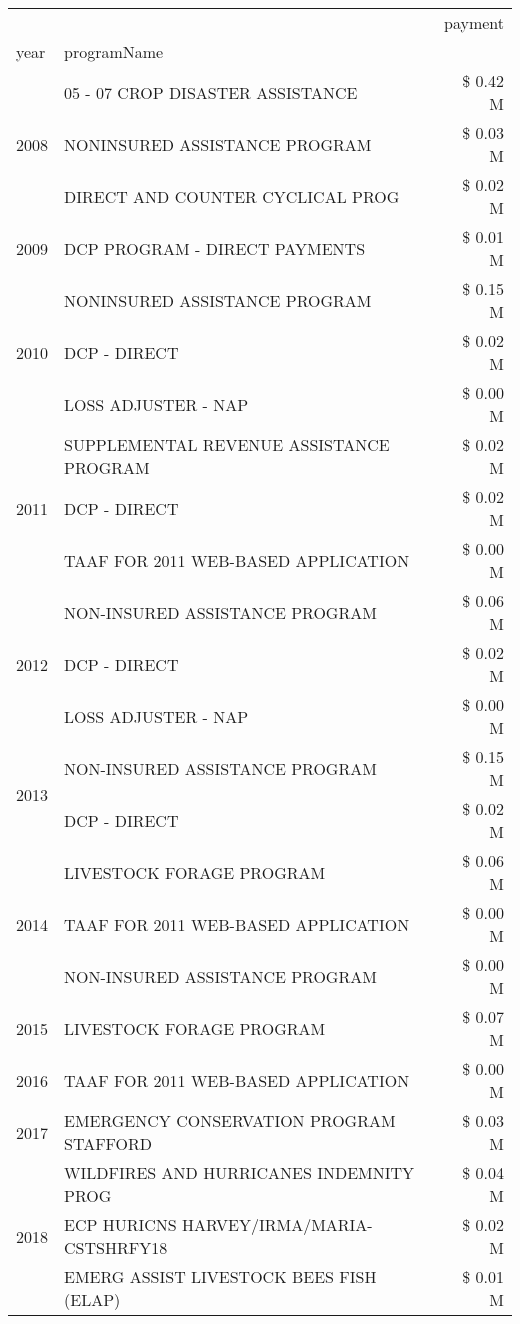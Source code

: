 \begin{tabular}{llr}
\toprule
 &  & payment \\
year & programName &  \\
\midrule
\multirow[t]{3}{*}{2008} & 05 - 07 CROP DISASTER ASSISTANCE & \$ 0.42 M \\
 & NONINSURED ASSISTANCE PROGRAM & \$ 0.03 M \\
 & DIRECT AND COUNTER CYCLICAL PROG & \$ 0.02 M \\
\cline{1-3}
2009 & DCP PROGRAM - DIRECT PAYMENTS & \$ 0.01 M \\
\cline{1-3}
\multirow[t]{3}{*}{2010} & NONINSURED ASSISTANCE PROGRAM & \$ 0.15 M \\
 & DCP - DIRECT & \$ 0.02 M \\
 & LOSS ADJUSTER - NAP & \$ 0.00 M \\
\cline{1-3}
\multirow[t]{3}{*}{2011} & SUPPLEMENTAL REVENUE ASSISTANCE PROGRAM & \$ 0.02 M \\
 & DCP - DIRECT & \$ 0.02 M \\
 & TAAF FOR 2011 WEB-BASED APPLICATION & \$ 0.00 M \\
\cline{1-3}
\multirow[t]{3}{*}{2012} & NON-INSURED ASSISTANCE PROGRAM & \$ 0.06 M \\
 & DCP - DIRECT & \$ 0.02 M \\
 & LOSS ADJUSTER - NAP & \$ 0.00 M \\
\cline{1-3}
\multirow[t]{2}{*}{2013} & NON-INSURED ASSISTANCE PROGRAM & \$ 0.15 M \\
 & DCP - DIRECT & \$ 0.02 M \\
\cline{1-3}
\multirow[t]{3}{*}{2014} & LIVESTOCK FORAGE PROGRAM & \$ 0.06 M \\
 & TAAF FOR 2011 WEB-BASED APPLICATION & \$ 0.00 M \\
 & NON-INSURED ASSISTANCE PROGRAM & \$ 0.00 M \\
\cline{1-3}
2015 & LIVESTOCK FORAGE PROGRAM & \$ 0.07 M \\
\cline{1-3}
2016 & TAAF FOR 2011 WEB-BASED APPLICATION & \$ 0.00 M \\
\cline{1-3}
2017 & EMERGENCY CONSERVATION PROGRAM STAFFORD & \$ 0.03 M \\
\cline{1-3}
\multirow[t]{3}{*}{2018} & WILDFIRES AND HURRICANES INDEMNITY PROG & \$ 0.04 M \\
 & ECP HURICNS HARVEY/IRMA/MARIA-CSTSHRFY18 & \$ 0.02 M \\
 & EMERG ASSIST LIVESTOCK BEES FISH (ELAP) & \$ 0.01 M \\
\cline{1-3}

\end{tabular}
